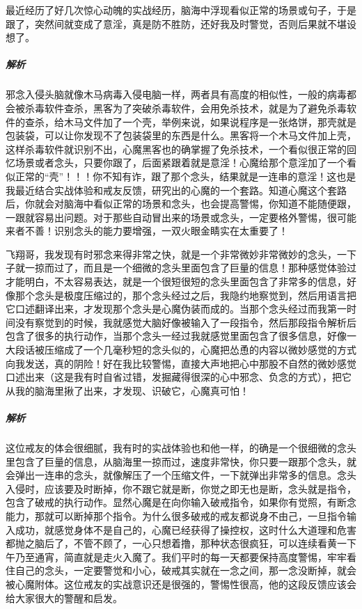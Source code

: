\begin{case}[加过壳的念头]
    最近经历了好几次惊心动魄的实战经历，脑海中浮现看似正常的场景或句子，于是跟了，突然间就变成了意淫，真是防不胜防，还好我及时警觉，否则后果就不堪设想了。
    \subparagraph{解析} 邪念入侵头脑就像木马病毒入侵电脑一样，两者具有高度的相似性，一般的病毒都会被杀毒软件查杀，黑客为了突破杀毒软件，会用免杀技术，就是为了避免杀毒软件的查杀，给木马文件加了一个壳，举例来说，如果说程序是一张烙饼，那壳就是包装袋，可以让你发现不了包装袋里的东西是什么。黑客将一个木马文件加上壳，这样杀毒软件就识别不出，心魔黑客也的确掌握了免杀技术，一个看似很正常的回忆场景或者念头，只要你跟了，后面紧跟着就是意淫！心魔给那个意淫加了一个看似正常的“壳”！！！你不知有诈，跟了那个念头，结果就是一连串的意淫！这也是我最近结合实战体验和戒友反馈，研究出的心魔的一个套路。知道心魔这个套路后，你就会对脑海中看似正常的场景和念头，也会提高警惕，你知道不能随便跟，一跟就容易出问题。对于那些自动冒出来的场景或念头，一定要格外警惕，很可能来者不善！识别念头的能力要增强，一双火眼金睛实在太重要了！
\end{case}

\begin{case}[压缩过的念头]
    飞翔哥，我发现有时邪念来得非常之快，就是一个非常微妙非常微妙的念头，一下子就一掠而过了，而且是一个细微的念头里面包含了巨量的信息！那种感觉体验过才能明白，不太容易表达，就是一个很短很短的念头里面包含了非常多的信息，好像那个念头是极度压缩过的，那个念头经过之后，我隐约地察觉到，然后用语言把它口述翻译出来，才发现那个念头是心魔伪装而成的。当那个念头经过而我第一时间没有察觉到的时候，我就感觉大脑好像被输入了一段指令，然后那段指令解析后包含了很多的执行动作，当那个念头一经过我就感觉里面包含了很多信息，好像一大段话被压缩成了一个几毫秒短的念头似的，心魔把怂恿的内容以微妙感觉的方式向我发送，真的阴险！好在我比较警惕，直接大声地把心中那股不自然的微妙感觉口述出来（这是我有时自省过错，发掘藏得很深的心中邪念、负念的方式），把它从我的脑海里揪了出来，才发现、识破它，心魔真可怕！
    \subparagraph{解析} 这位戒友的体会很细腻，我有时的实战体验也和他一样，的确是一个很细微的念头里包含了巨量的信息，从脑海里一掠而过，速度非常快，你只要一跟那个念头，就会弹出一连串的念头，就像解压了一个压缩文件，一下就弹出非常多的信息。念头入侵时，应该要及时断掉，你不跟它就是断，你觉之即无也是断，念头就是指令，包含了破戒的执行动作。显然心魔是在向你输入破戒指令，如果你有觉照，有断念能力，那就可以断掉那个指令。为什么很多破戒的戒友都说身不由己，一旦指令输入成功，就感觉身体不是自己的，心魔已经获得了操控权，这时什么大道理和危害都抛之脑后了，不管不顾了，一心只想着撸，那种状态很疯狂，可以连续看黄一下午乃至通宵，简直就是走火入魔了。我们平时的每一天都要保持高度警惕，牢牢看住自己的念头，一定要警觉和小心，破戒其实就在一念之间，那一念没断掉，就会被心魔附体。这位戒友的实战意识还是很强的，警惕性很高，他的这段反馈应该会给大家很大的警醒和启发。
\end{case}

